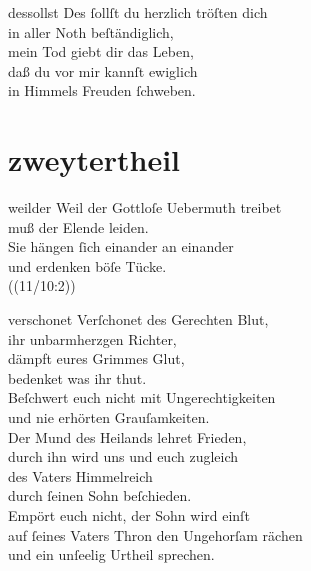 \documentclass[tocstyle=ref-genre]{ees}
\begin{document}
{  \begin{movement}{dessollst}
    \voice[Coro]
    Des ſollſt du herzlich tröſten dich\\
    in aller Noth beſtändiglich,\\
    mein Tod giebt dir das Leben,\\
    daß du vor mir kannſt ewiglich\\
    in Himmels Freuden ſchweben.
  \end{movement}

  \part{zweytertheil}

  \begin{movement}{weilder}
    \voice[Coro]
    Weil der Gottloſe Uebermuth treibet\\
    muß der Elende leiden.\\
    Sie hängen ſich einander an einander\\
    und erdenken böſe Tücke.\\
    ((11/10:2))
  \end{movement}

  \begin{movement}{verschonet}
    \voice[Soprano]
    Verſchonet des Gerechten Blut,\\
    ihr unbarmherzgen Richter,\\
    dämpft eures Grimmes Glut,\\
    bedenket was ihr thut.\\
    Beſchwert euch nicht mit Ungerechtigkeiten\\
    und nie erhörten Grauſamkeiten.\\
    Der Mund des Heilands lehret Frieden,\\
    durch ihn wird uns und euch zugleich\\
    des Vaters Himmelreich\\
    durch ſeinen Sohn beſchieden.\\
    Empört euch nicht, der Sohn wird einſt\\
    auf ſeines Vaters Thron den Ungehorſam rächen\\
    und ein unſeelig Urtheil sprechen.
  \end{movement}

  \begin{movement}{}
    \voice[]
  \end{movement}

}
\end{document}
